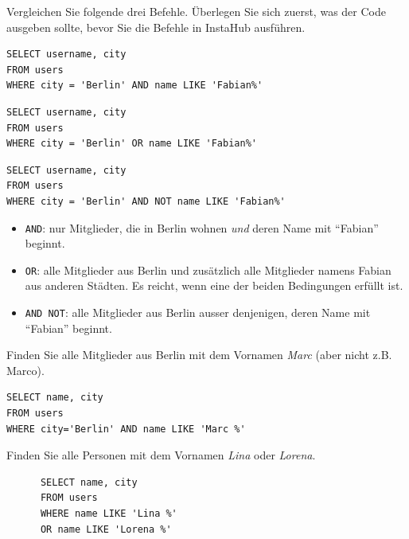 \begin{myexercise}
  Vergleichen Sie folgende drei Befehle. Überlegen Sie sich zuerst, was der Code ausgeben sollte, bevor Sie die Befehle in InstaHub ausführen.

  \begin{lstlisting}
SELECT username, city
FROM users
WHERE city = 'Berlin' AND name LIKE 'Fabian%'
\end{lstlisting}

  \begin{lstlisting}
SELECT username, city
FROM users
WHERE city = 'Berlin' OR name LIKE 'Fabian%'
\end{lstlisting}

  \begin{lstlisting}
SELECT username, city
FROM users
WHERE city = 'Berlin' AND NOT name LIKE 'Fabian%'
\end{lstlisting}
  \begin{myanswer}
    \begin{itemize}
      \item \lstinline|AND|: nur Mitglieder, die in Berlin wohnen \textit{und} deren Name mit \enquote{Fabian} beginnt.
      \item \lstinline|OR|: alle Mitglieder aus Berlin und zusätzlich alle Mitglieder namens Fabian aus anderen Städten. Es reicht, wenn eine der beiden Bedingungen erfüllt ist.
      \item \lstinline|AND NOT|: alle Mitglieder aus Berlin ausser denjenigen, deren Name mit \enquote{Fabian} beginnt.
    \end{itemize}
  \end{myanswer}
\end{myexercise}

\begin{myexercise}
  Finden Sie alle Mitglieder aus Berlin mit dem Vornamen \textit{Marc} (aber nicht z.B. Marco).
  \begin{myanswer}
    \begin{lstlisting}
SELECT name, city
FROM users
WHERE city='Berlin' AND name LIKE 'Marc %'
\end{lstlisting}
  \end{myanswer}
\end{myexercise}

\begin{myexercise}
  Finden Sie alle Personen mit dem Vornamen \textit{Lina} oder \textit{Lorena}.
  \begin{myanswer}
    \begin{lstlisting}
      SELECT name, city
      FROM users
      WHERE name LIKE 'Lina %'
      OR name LIKE 'Lorena %'
    \end{lstlisting}
  \end{myanswer}
\end{myexercise}


